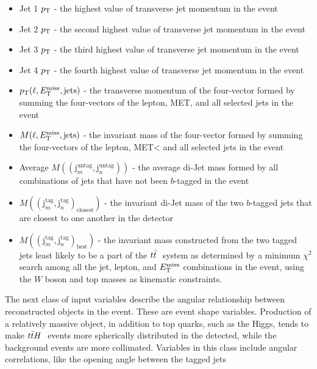 \begin{itemize}
  \item Jet 1 $p_{\mathrm{T}}$ - the highest value of transverse jet momentum in
    the event
  \item Jet 2 $p_{\mathrm{T}}$ - the second highest value of transverse jet
    momentum in the event
  \item Jet 3 $p_{\mathrm{T}}$  - the third highest value of transverse jet
    momentum in the event
  \item Jet 4 $p_{\mathrm{T}}$  - the fourth highest value of transverse jet
    momentum in the event
  \item $p_{\mathrm{T}}(\ell,E_{\mathrm{T}}^{\text{miss}},\text{jets})$ - the transverse momentum of the
    four-vector formed by summing the four-vectors of the lepton, MET,
    and all selected jets in the event
  \item $M(\ell,E_{\mathrm{T}}^{\text{miss}},\text{jets})$ - the invariant mass of the
    four-vector formed by summing the four-vectors of the lepton, MET<
    and all selected jets in the event
  \item Average
    $M((\text{j}_m^{\text{untag}},\text{j}_n^{\text{untag}}))$ - the
    average di-Jet mass formed by all combinations of jets that have
    not been $b$-tagged in the event
  \item
    $M((\text{j}_m^{\text{tag}},\text{j}_n^{\text{tag}})_{\text{closest}})$
    - the invariant di-Jet mass of the two $b$-tagged jets that are
    closest to one another in the detector
  \item
    $M((\text{j}_m^{\text{tag}},\text{j}_n^{\text{tag}})_{\text{best}})$
    - the invariant mass constructed from the two tagged jets least
    likely to be a part of the $t{\bar{t}}~$ system as determined by a
    minimum $\chi^2$ search among all the jet, lepton, and $E_{\mathrm{T}}^{\text{miss}}$
    combinations in the event, using the $W$ boson and top masses as
    kinematic constraints.
\end{itemize}

\par The next class of input variables describe the angular
relationship between reconstructed objects in the event.  These are
event shape variables.  Production of a relatively massive object, in
addition to top quarks, such as the Higgs, tends to make $t{\bar{t}}H~$
events more spherically distributed in the detected, while the
background events are more collimated.  Variables in this class
include angular correlations, like the opening angle between the
tagged jets 

